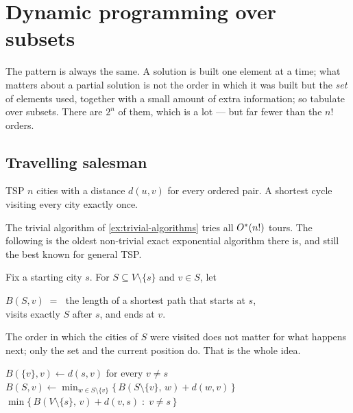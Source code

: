 \section{Dynamic programming over subsets}
\label{sec:subset-dp}

The pattern is always the same. A solution is built one element at a time; what
matters about a partial solution is not the order in which it was built but the
\emph{set} of elements used, together with a small amount of extra information;
so tabulate over subsets. There are $2^n$ of them, which is a lot --- but far
fewer than the $n!$ orders.

\subsection{Travelling salesman}

\begin{probdef}{TSP}
  \instance $n$ cities with a distance $d(u,v)$ for every ordered pair.
  \question A shortest cycle visiting every city exactly once.
\end{probdef}

The trivial algorithm of \cref{ex:trivial-algorithms} tries all $O^{*}(n!)$
tours. The following is the oldest non-trivial exact exponential algorithm there
is, and still the best known for general TSP.

Fix a starting city $s$. For $S \subseteq V \setminus \{s\}$ and $v \in S$, let
\begin{center}
$B(S,v) \;=\;$ the length of a shortest path that starts at $s$,\\
visits exactly $S$ after $s$, and ends at $v$.
\end{center}
The order in which the cities of $S$ were visited does not matter for what
happens next; only the set and the current position do. That is the whole idea.

\begin{algorithm}[ht]
\caption{Held--Karp for }
\label{alg:held-karp}
\begin{algorithmic}[1]
  \State $B(\{v\}, v) \gets d(s,v)$ for every $v \ne s$
      \State $B(S,v) \gets \displaystyle\min_{w \in S \setminus \{v\}}
             \bigl\{\, B(S \setminus \{v\},\, w) + d(w,v) \,\bigr\}$
    \EndFor
  \EndFor
  \State \Return $\min\bigl\{\, B(V \setminus \{s\},\, v) + d(v,s)
         \;:\; v \ne s \,\bigr\}$
\end{algorithmic}
\end{algorithm}


